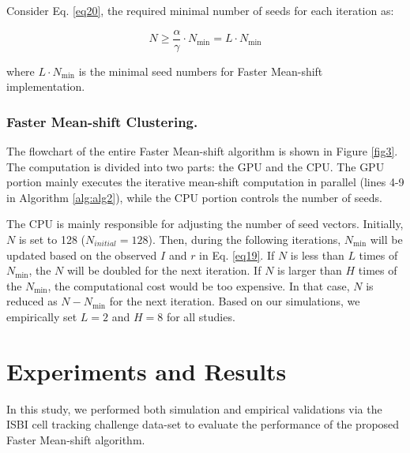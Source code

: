 \documentclass[journal,twoside,web]{ieeecolor}
\begin{document}
Consider Eq. \eqref{eq20}, the required minimal number of seeds for each iteration as:


\begin{equation}
N \ge \frac{\alpha }{\gamma } \cdot {N_{\min }} = L \cdot {N_{\min }}
\label{eq21}
\end{equation}

\noindent where $L \cdot {N_{\min }}$ is the minimal seed numbers for Faster Mean-shift implementation. 


\subsubsection{Faster Mean-shift Clustering.}
The flowchart of the entire Faster Mean-shift algorithm is shown in Figure \ref{fig3}. The computation is divided into two parts: the GPU and the CPU. The GPU portion mainly executes the iterative mean-shift computation in parallel (lines 4-9 in Algorithm \ref{alg:alg2}), while the CPU portion controls the number of seeds. 

The CPU is mainly responsible for adjusting the number of seed vectors. Initially, $N$ is set to 128 ($N_{initial}=128$). Then, during the following iterations, $N_{\min }$ will be updated based on the observed $I$ and $r$ in Eq. \eqref{eq19}. If $N$ is less than $L$ times of $N_{\min }$, the $N$ will be doubled for the next iteration. If $N$ is larger than $H$ times of the $N_{\min }$, the computational cost would be too expensive. In that case, $N$ is reduced as $N-N_{\min }$ for the next iteration. Based on our simulations, we empirically set $L=2$ and $H=8$ for all studies.

\section{Experiments and Results}
In this study, we performed both simulation and empirical validations via the ISBI cell tracking challenge data-set to evaluate the performance of the proposed Faster Mean-shift algorithm.
\end{document}
